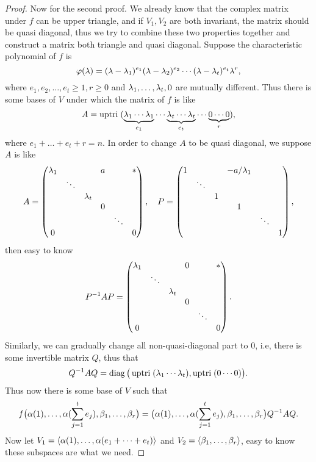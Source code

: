 \begin{proof}
	Now for the second proof. We already know that the complex matrix under $f$ can be upper triangle, and if $V_1,V_2$ are both invariant, the matrix should be quasi diagonal, thus we try to combine these two properties together and construct a matrix both triangle and quasi diagonal. Suppose the characteristic polynomial of $f$ is
	\[\varphi(\lambda)=(\lambda-\lambda_1)^{e_1}(\lambda-\lambda_2)^{e_2}\cdots(\lambda-\lambda_t)^{e_t}\lambda^r,\]
	where $e_1,e_2,\dots,e_t\geq 1, r\geq 0$ and $\lambda_1,\dots,\lambda_t,0$ are mutually different. Thus there is some bases of $V$ under which the matrix of $f$ is like
	\[A=\operatorname*{uptri\;}(\underbrace{\lambda_1\cdots\lambda_1}_{e_1}\cdots\underbrace{\lambda_t\cdots\lambda_t}_{e_t}
	\cdots\underbrace{0\cdots0}_{r}),\]
	where $e_1+\dots+e_t+r=n$. In order to change $A$ to be quasi diagonal, we suppose $A$ is like 
	\[A=\begin{pmatrix}
    \lambda_1&	&	&a	&	&*	\\
		&\ddots&	&	&	&	\\
		&	&\lambda_t&	&	&	\\
		&	&	&0	&	&	\\
		&	&	&	&\ddots	&	\\
	   0&	&	&	&	&0	
	\end{pmatrix},\quad
	P=\begin{pmatrix}
   		1&	&	&-a/\lambda_1&	&	\\
		&\ddots&	&	&	&	\\
		&	&1&	&	&	\\
		&	&	&1	&	&	\\
		&	&	&	&\ddots	&	\\
	    &	&	&	&	&1	
	\end{pmatrix},\]
	then easy to know 
	\[P^{-1}AP=\begin{pmatrix}
   	\lambda_1&	&	&0	&	&*	\\
		&\ddots&	&	&	&	\\
		&	&\lambda_t&	&	&	\\
		&	&	&0	&	&	\\
		&	&	&	&\ddots	&	\\
	   0&	&	&	&	&0	
	\end{pmatrix}.\]
	Similarly, we can gradually change all non-quasi-diagonal part to $0$, i.e, there is some invertible matrix $Q$, thus that
	\[Q^{-1}AQ=\operatorname*{diag}\big(\operatorname*{uptri\;}(\lambda_1\cdots\lambda_t),\operatorname*{uptri\;}(0\cdots0)\big).\]
	Thus now there is some base of $V$ such that 
	\[f\big(\alpha(1),\dots,\alpha(\sum_{j=1}^t e_j),\beta_1,\dots,\beta_r\big)=\big(\alpha(1),\dots,\alpha(\sum_{j=1}^t e_j),\beta_1,\dots,\beta_r\big)Q^{-1}AQ.\]
	Now let $V_1=\left\langle \alpha(1),\dots,\alpha(e_1+\dots+e_t)\right\rangle$ and $V_2=\left\langle \beta_1,\dots,\beta_r\right\rangle$, easy to know these subspaces are what we need.
\end{proof}


